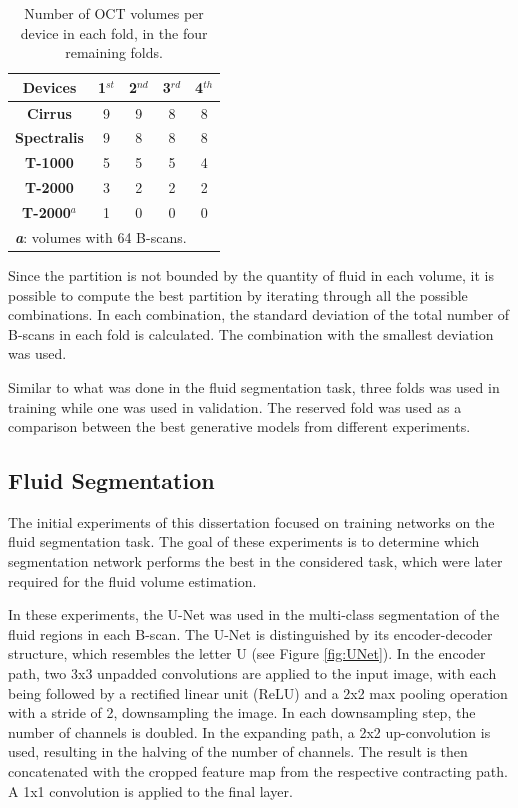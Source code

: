 \begin{table}[!ht]
	\setlength{\tabcolsep}{6pt}
	\renewcommand{\arraystretch}{1.3}
	\caption{Number of OCT volumes per device in each fold, in the four remaining folds.}
	\centering
	\begin{tabular}{|c|c|c|c|c|}
		\hline
		\textbf{Devices} & \textbf{1$^{st}$} & \textbf{2$^{nd}$} & \textbf{3$^{rd}$} & \textbf{4$^{th}$} \\
		\hline
		\textbf{Cirrus} & 9 & 9 & 8 & 8 \\
		\textbf{Spectralis} & 9 & 8 & 8 & 8 \\
		\textbf{T-1000} & 5 & 5 & 5 & 4 \\
		\textbf{T-2000} & 3 & 2 & 2 & 2 \\
		\textbf{T-2000$^{a}$} & 1 & 0 & 0 & 0 \\
		\hline
		\multicolumn{5}{l}{\textbf{\textit{a}}: volumes with 64 B-scans.} \\
	\end{tabular}
	\label{tab:FourFoldSplit}
\end{table}

Since the partition is not bounded by the quantity of fluid in each volume, it is possible to compute the best partition by iterating through all the possible combinations. In each combination, the standard deviation of the total number of B-scans in each fold is calculated. The combination with the smallest deviation was used. 
\par
Similar to what was done in the fluid segmentation task, three folds was used in training while one was used in validation. The reserved fold was used as a comparison between the best generative models from different experiments.

\subsection{Fluid Segmentation}
The initial experiments of this dissertation focused on training networks on the fluid segmentation task. The goal of these experiments is to determine which segmentation network performs the best in the considered task, which were later required for the fluid volume estimation.
\par
In these experiments, the U-Net \parencite{Ronneberger2015} was used in the multi-class segmentation of the fluid regions in each B-scan. The U-Net is distinguished by its encoder-decoder structure, which resembles the letter U (see Figure \ref{fig:UNet}). In the encoder path, two 3x3 unpadded convolutions are applied to the input image, with each being followed by a rectified linear unit (ReLU) and a 2x2 max pooling operation with a stride of 2, downsampling the image. In each downsampling step, the number of channels is doubled. In the expanding path, a 2x2 up-convolution is used, resulting in the halving of the number of channels. The result is then concatenated with the cropped feature map from the respective contracting path. A 1x1 convolution is applied to the final layer.


